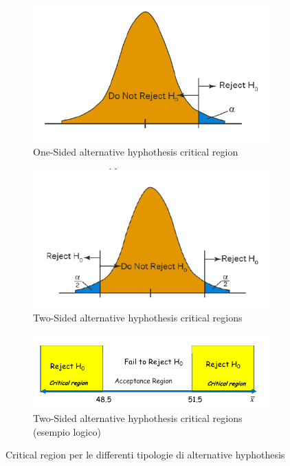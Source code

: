\begin{figure}[h]
\centering
\begin{subfigure}[b]{0.4\textwidth}
\centering
\includegraphics[width=\textwidth]{img/chapter-4/one-sided-critical.png}
\caption{One-Sided alternative hyphothesis critical region}
\end{subfigure}

\hfill

\begin{subfigure}[b]{0.4\textwidth}
\centering
\includegraphics[width=\textwidth]{img/chapter-4/two-sided-critical.png}
\caption{Two-Sided alternative hyphothesis critical regions}
\end{subfigure}

\begin{subfigure}[b]{0.5\textwidth}
\centering
\includegraphics[width=\textwidth]{img/chapter-4/regioni critiche.png}
\caption{Two-Sided alternative hyphothesis critical regions (esempio logico)}
\end{subfigure}

\caption{Critical region per le differenti tipologie di alternative hyphothesis}\label{img:critical-regions}
\end{figure}

